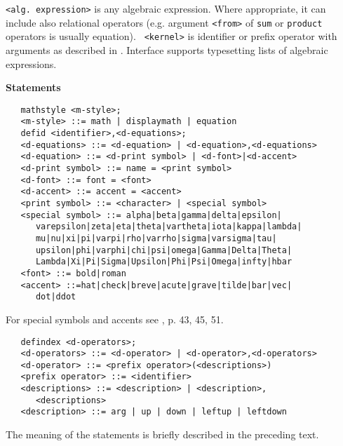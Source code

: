 {\tt <alg. expression>} is any algebraic expression. Where appropriate,
it can include also relational operators (e.g. argument {\tt <from>} of
{\tt sum} or {\tt product} operators is usually equation). {\tt
<kernel>} is identifier or prefix operator with arguments as described
in \cite{Hearn:95}. Interface supports typesetting lists of algebraic
expressions.


{\bf Statements}

\begin{verbatim}
   mathstyle <m-style>;
   <m-style> ::= math | displaymath | equation
   defid <identifier>,<d-equations>;
   <d-equations> ::= <d-equation> | <d-equation>,<d-equations>
   <d-equation> ::= <d-print symbol> | <d-font>|<d-accent>
   <d-print symbol> ::= name = <print symbol>
   <d-font> ::= font = <font>
   <d-accent> ::= accent = <accent>
   <print symbol> ::= <character> | <special symbol>
   <special symbol> ::= alpha|beta|gamma|delta|epsilon|
      varepsilon|zeta|eta|theta|vartheta|iota|kappa|lambda|
      mu|nu|xi|pi|varpi|rho|varrho|sigma|varsigma|tau|
      upsilon|phi|varphi|chi|psi|omega|Gamma|Delta|Theta|
      Lambda|Xi|Pi|Sigma|Upsilon|Phi|Psi|Omega|infty|hbar
   <font> ::= bold|roman
   <accent> ::=hat|check|breve|acute|grave|tilde|bar|vec|
      dot|ddot
\end{verbatim}

For special symbols and accents see \cite{Lamport:86}, p. 43, 45, 51.

\begin{verbatim}
   defindex <d-operators>;
   <d-operators> ::= <d-operator> | <d-operator>,<d-operators>
   <d-operator> ::= <prefix operator>(<descriptions>)
   <prefix operator> ::= <identifier>
   <descriptions> ::= <description> | <description>,
      <descriptions>
   <description> ::= arg | up | down | leftup | leftdown
\end{verbatim}

The meaning of the statements is briefly described in the preceding
text.


